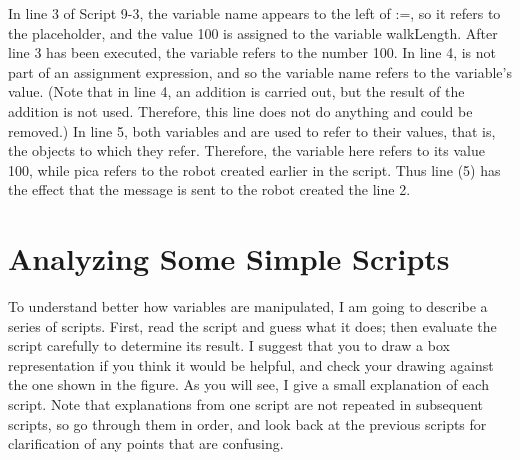 \documentclass[a4paper,10pt,twoside]{book}
\begin{document}
In line 3 of Script 9-3, the variable name  appears to the left of :=, so it refers to the placeholder, and the value 100 is assigned to the variable walkLength. After line 3 has been executed, the variable  refers to the number 100. In line 4,  is not part of an assignment expression, and so the variable name refers to the variable’s value. (Note that in line 4, an addition is carried out, but the result of the addition is not used. Therefore, this line does not do anything and could be removed.) In line 5, both variables  and  are used to refer to their values, that is, the objects to which they refer. Therefore, the variable  here refers to its value 100, while pica refers to the robot created earlier in the script. Thus line (5) has the effect that the message  is sent to the robot created the line 2. 




\section*{Analyzing Some Simple Scripts}
To understand better how variables are manipulated, I am going to describe a series of scripts. 
First, read the script and guess what it does; then evaluate the script carefully to determine its result. I suggest that you to draw a box representation if you think it would be helpful, and check your drawing against the one shown in the figure. As you will see, I   give a small explanation of each script. Note that explanations from one script are not repeated in subsequent scripts, so go through them in order, and look back at the previous scripts for clarification of any points that are confusing. 


\end{document}
